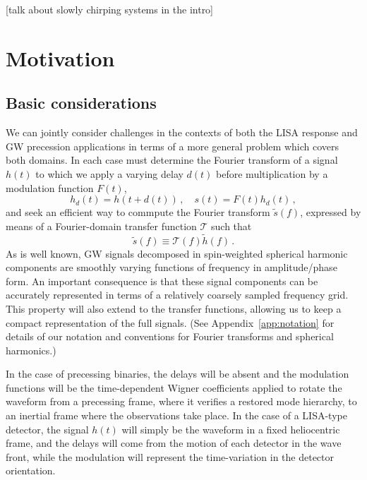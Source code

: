\documentclass[aps,showpacs,twocolumn,
prd,superscriptaddress,nofootinbib]{revtex4-1}
\newcommand{\be}{\begin{equation}}
\newcommand{\ee}{\end{equation}}
\newcommand\calT{{\mathcal{T}}}
\newcommand{\SM}[1]{{\color{Red} #1}}
\begin{document}
\SM{[talk about slowly chirping systems in the intro]}


\section{Motivation}
\label{sec:motivation}


\subsection{Basic considerations}
\label{subsec:basic}

We can jointly consider challenges in the contexts of both the LISA response and GW precession applications in terms of a more general problem which covers both domains. In each case must determine the Fourier transform of a signal $h(t)$ to which we apply a varying delay $d(t)$ before multiplication by a modulation function $F(t)$,
\be
\label{eq:delay-mod-defs}
	h_{d}(t) = h(t+d(t)) \,, \quad s(t) = F(t)h_{d}(t) \,,
\ee
and seek an efficient way to commpute the Fourier transform $\tilde{s}(f)$, expressed by means of a Fourier-domain transfer function $\calT$ such that
\be\label{eq:deftransfer}
	\tilde{s}(f) \equiv \calT(f) \tilde{h}(f) \,. 
\ee
As is well known, GW signals decomposed in spin-weighted spherical harmonic components are smoothly varying functions of frequency in amplitude/phase form. An important consequence is that these signal components can be accurately represented in terms of a relatively coarsely sampled frequency grid. This property will also extend to the transfer functions, allowing us to keep a compact representation of the full signals. (See Appendix~\ref{app:notation} for details of our notation and conventions for Fourier transforms and spherical harmonics.)

In the case of precessing binaries, the delays will be absent and the modulation functions will be the time-dependent Wigner coefficients applied to rotate the waveform from a precessing frame, where it verifies a restored mode hierarchy, to an inertial frame where the observations take place. In the case of a LISA-type detector, the signal $h(t)$ will simply be the waveform in a fixed heliocentric frame, and the delays will come from the motion of each detector in the wave front, while the modulation will represent the time-variation in the detector orientation.
\end{document}
